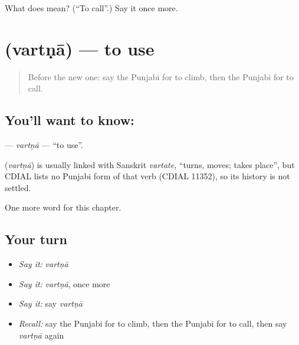 \begin{tcolorbox}[breakable,colback=teal!4,colframe=teal!35!black,title={Before you move on}]
What does  mean? (\textquotedblleft{}To call\textquotedblright{}.) Say it once more.
\end{tcolorbox}
\section[\texorpdfstring{\pa{ਵਰਤਣਾ} (vartṇā)}{ਵਰਤਣਾ (vartṇā)}]{ (vartṇā) — to use}

\label{lesson:PA-C149-vartna}



\begin{quote}
Before the new one: say the Punjabi for to climb, then the Punjabi for to call.
\end{quote}

\subsection*{You'll want to know: }
\textbf{} — \emph{vartṇā} — \textquotedblleft{}to use\textquotedblright{}.

\begin{cousinweb}
\textbf{} (\emph{vartṇā}) is usually linked with Sanskrit \emph{vartate}, \textquotedblleft{}turns, moves; takes place\textquotedblright{}, but CDIAL lists no Punjabi form of that verb (CDIAL 11352), so its history is not settled.
\end{cousinweb}

\begin{grammarlens}[title={What you've built}]
One more word for this chapter.
\end{grammarlens}

\subsection*{Your turn}
\begin{itemize}
\raggedright
  \item \emph{Say it:} \emph{vartṇā}
  \item \emph{Say it:} \emph{vartṇā}, once more
  \item \emph{Say it:} say \emph{vartṇā}
  \item \emph{Recall:} say the Punjabi for to climb, then the Punjabi for to call, then say \emph{vartṇā} again
\end{itemize}

